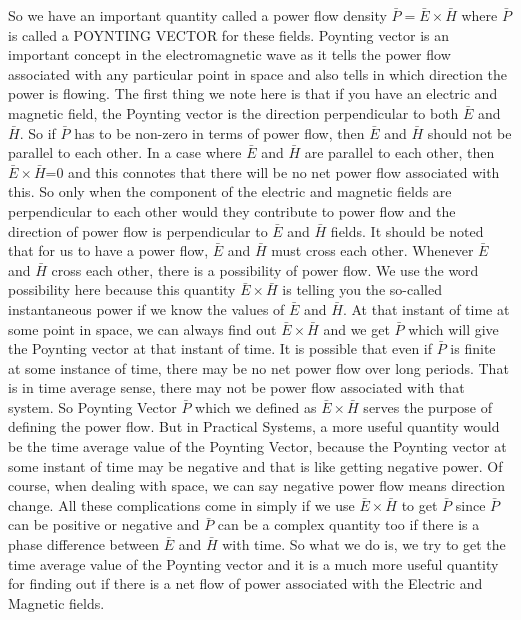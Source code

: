 So we have an important quantity called a power flow density $ \bar{P}=\bar{E}\times\bar{H} $ where $  \bar{P}  $ is called a POYNTING VECTOR for these fields. Poynting vector is an important concept in the electromagnetic wave as it tells the power flow associated with any particular point in space and also tells in which direction the power is flowing. The first thing we note here is that if you have an electric and magnetic field, the Poynting vector is the direction perpendicular to both $ \bar{E} $ and  $ \bar{H} $. So if $  \bar{P}  $  has to be non-zero in terms of power flow, then $ \bar{E} $ and  $ \bar{H} $ should not be parallel to each other. In a case where  $ \bar{E} $ and  $ \bar{H} $ are parallel to each other, then  $ \bar{E}\times\bar{H} $=0 and this connotes that there will be no net power flow associated with this. So only when the component of the electric and magnetic fields are perpendicular to each other would they contribute to power flow and the direction of power flow is perpendicular to $ \bar{E} $ and  $ \bar{H} $    fields. It should be noted that for us to have a power flow, $ \bar{E} $ and  $ \bar{H} $  must cross each other. Whenever $ \bar{E} $ and  $ \bar{H} $ cross each other, there is a possibility of power flow. We use the word possibility here because this quantity   $ \bar{E}\times\bar{H} $ is telling you the so-called instantaneous power if we know the values of  $ \bar{E} $ and  $ \bar{H} $. At that instant of time at some point in space, we can always find out $ \bar{E}\times\bar{H} $ and we get $  \bar{P}  $ which will give the Poynting vector at that instant of time. It is possible that even if $  \bar{P}  $ is finite at some instance of time, there may be no net power flow over long periods. That is in time average sense, there may not be power flow associated with that system. So Poynting Vector $  \bar{P}  $ which we defined as $ \bar{E}\times\bar{H} $  serves the purpose of defining the power flow. But in Practical Systems, a more useful quantity would be the time average value of the Poynting Vector, because the Poynting vector at some instant of time may be negative and that is like getting negative power. Of course, when dealing with space, we can say negative power flow means direction change. All these complications come in simply if we use $ \bar{E}\times\bar{H} $ to get  $  \bar{P}  $ since $  \bar{P}  $  can be positive or negative and $  \bar{P}  $  can be a complex quantity too if there is a phase difference between $ \bar{E} $ and  $ \bar{H} $ with time. So what we do is, we try to get the time average value of the Poynting vector and it is a much more useful quantity for finding out if there is a net flow of power associated with the Electric and Magnetic fields. 

